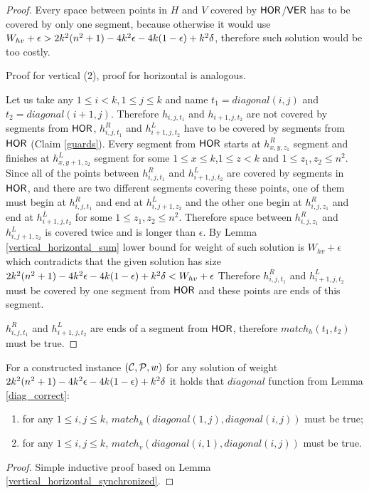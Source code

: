 \begin{proof}
Every space between points in $H$ and $V$ covered by $\mathsf{HOR}$/$\mathsf{VER}$
has to be covered by only one segment, because otherwise it would
use $W_{hv} + \epsilon > 2k^2(n^2+1) - 4k^2\epsilon -4k(1-\epsilon) +k^2\delta$,
therefore such solution would be too costly.

Proof for vertical (2), proof for horizontal is analogous.

Let us take any $1 \le i < k, 1 \le j \le k$
and name $t_1 = diagonal(i, j)$ and $t_2 = diagonal(i+1, j)$.
Therefore $h_{i,j,t_1}$ and $h_{i+1,j,t_2}$
are not covered by segments from $\mathsf{HOR}$,
$h^R_{i,j,t_1}$ and $h^L_{i+1,j,t_2}$
have to be covered by segments from $\mathsf{HOR}$ (Claim \ref{guards}).
Every segment from $\mathsf{HOR}$ starts at $h^R_{x,y,z_1}$
segment and finishes at $h^L_{x,y+1,z_2}$ segment for some
$1 \le x \le k$,$1 \le z < k$ and $1 \le z_1, z_2 \le n^2$.
Since all of the points between $h^R_{i,j,t_1}$ and $h^L_{i+1,j,t_2}$
are covered by segments in $\mathsf{HOR}$,
and there are two different segments covering
these points, one of them must begin
at $h^R_{i,j,t_1}$ and end at $h^L_{i,j+1,z_2}$
and the other one begin at $h^R_{i,j,z_1}$
and end at $h^L_{i+1,j,t_2}$
for some $1 \le z_1, z_2 \le n^2$.
Therefore space between $h^R_{i,j,z_1}$ and $h^L_{i,j+1,z_2}$
is covered twice and is longer than $\epsilon$.
By Lemma \ref{vertical_horizontal_sum}
lower bound for weight of such solution is $W_{hv} + \epsilon$
which contradicts that the given solution has size $2k^2(n^2+1) - 4k^2\epsilon -4k(1-\epsilon) +k^2\delta < W_{hv} + \epsilon$
Therefore $h^R_{i,j,t_1}$ and $h^L_{i+1,j,t_2}$ must be covered
by one segment from $\mathsf{HOR}$ and these points are ends of this segment.

$h^R_{i,j,t_1}$ and $h^L_{i+1,j,t_2}$
are ends of a segment from $\mathsf{HOR}$,
therefore $match_h(t_1,t_2)$ must be true.
\end{proof}

\begin{corollary}
\label{vertical_horizontal_synchronized_inductive}
For a constructed instance $(\mathcal{C}, \mathcal{P}, w)$
for any solution of weight $2k^2(n^2+1) - 4k^2\epsilon -4k(1-\epsilon) +k^2\delta$ it holds that $diagonal$ function
from Lemma \ref{diag_correct}:
\begin{enumerate}
\item 
for any $1 \le i, j \le k$,
$match_h(diagonal(1, j),diagonal(i, j))$ must be true;
\item 
for any $1 \le i, j \le k$,
$match_v(diagonal(i, 1),diagonal(i, j))$ must be true.
\end{enumerate}
\end{corollary}
\begin{proof}
Simple inductive proof based on Lemma \ref{vertical_horizontal_synchronized}.
\end{proof}

